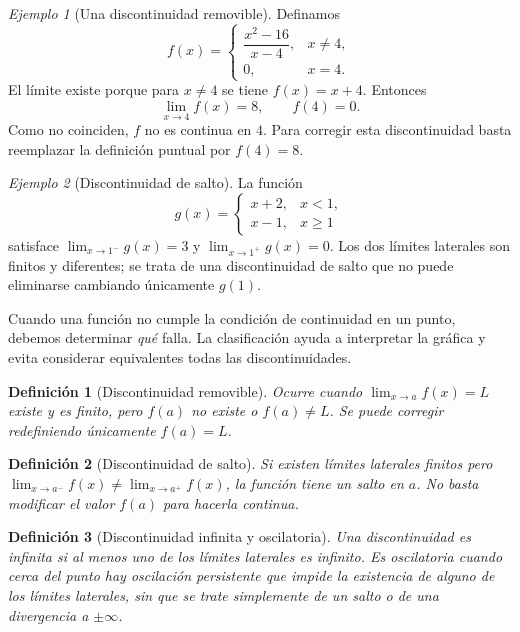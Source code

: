 \documentclass[12pt]{article}
\newtheorem{definicion}{Definición}[section]
\theoremstyle{remark}
\newtheorem{ejemplo}{Ejemplo}
\begin{document}
\begin{ejemplo}[Una discontinuidad removible]
Definamos
\[
 f(x)=\begin{cases}\dfrac{x^2-16}{x-4},&x\ne4,\\0,&x=4.\end{cases}
\]
El límite existe porque para $x\ne4$ se tiene $f(x)=x+4$. Entonces
\[
 \lim_{x\to4}f(x)=8,\qquad f(4)=0.
\]
Como no coinciden, $f$ no es continua en $4$. Para corregir esta discontinuidad basta reemplazar la definición puntual por $f(4)=8$.
\end{ejemplo}

\begin{ejemplo}[Discontinuidad de salto]
La función
\[
 g(x)=\begin{cases}x+2,&x<1,\\x-1,&x\ge1\end{cases}
\]
satisface $\lim_{x\to1^-}g(x)=3$ y $\lim_{x\to1^+}g(x)=0$. Los dos límites laterales son finitos y diferentes; se trata de una discontinuidad de salto que no puede eliminarse cambiando únicamente $g(1)$.
\end{ejemplo}
Cuando una función no cumple la condición de continuidad en un punto, debemos determinar \emph{qué} falla. La clasificación ayuda a interpretar la gráfica y evita considerar equivalentes todas las discontinuidades.

\begin{definicion}[Discontinuidad removible]
Ocurre cuando $\lim_{x\to a}f(x)=L$ existe y es finito, pero $f(a)$ no existe o $f(a)\ne L$. Se puede corregir redefiniendo únicamente $f(a)=L$.
\end{definicion}

\begin{definicion}[Discontinuidad de salto]
Si existen límites laterales finitos pero $\lim_{x\to a^-}f(x)\ne\lim_{x\to a^+}f(x)$, la función tiene un salto en $a$. No basta modificar el valor $f(a)$ para hacerla continua.
\end{definicion}

\begin{definicion}[Discontinuidad infinita y oscilatoria]
Una discontinuidad es \emph{infinita} si al menos uno de los límites laterales es infinito. Es \emph{oscilatoria} cuando cerca del punto hay oscilación persistente que impide la existencia de alguno de los límites laterales, sin que se trate simplemente de un salto o de una divergencia a $\pm\infty$.
\end{definicion}
\end{document}
